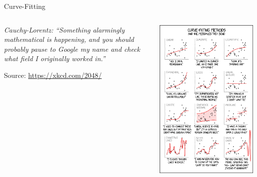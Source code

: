\begin{frame}{Curve-Fitting}
%
\vspace{-12pt}
\begin{columns}[T]
\begin{center}
	\vspace{60pt}
	\emph{Cauchy-Lorentz: \enquote{Something alarmingly mathematical is happening, and you should probably pause to Google my name and check what field I originally worked in.}}

	\vspace{6pt}
	Source: \url{https://xkcd.com/2048/}
\end{center}
%
\vspace{-43pt}
\begin{center}
	\includegraphics[width=.74\linewidth]{./gfx/05-xkcd-curveFitting}
\end{center}
\end{columns}
%
\end{frame}



